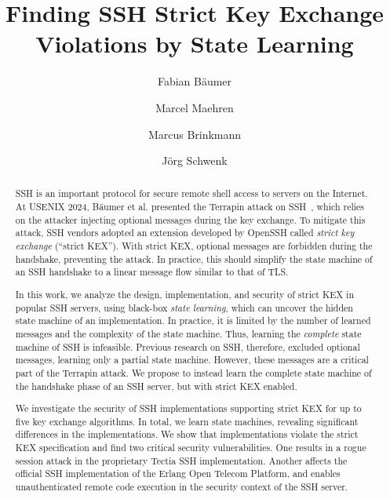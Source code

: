 \documentclass[sigconf]{acmart}
\begin{document}
\title{Finding SSH Strict Key Exchange Violations by State Learning}

\author{Fabian Bäumer}

\author{Marcel Maehren}

\author{Marcus Brinkmann}

\author{Jörg Schwenk}

\renewcommand{\shortauthors}{Fabian Bäumer, Marcel Maehren, Marcus Brinkmann, and Jörg Schwenk}

\begin{abstract}
  SSH is an important protocol for secure remote shell access to servers on the Internet. At USENIX 2024, Bäumer et al. presented the Terrapin attack on SSH~\cite{USENIX:BauBriSch24}, which relies on the attacker injecting optional messages during the key exchange. To mitigate this attack, SSH vendors adopted an extension developed by OpenSSH called \emph{strict key exchange} (``strict KEX''). With strict KEX, optional messages are forbidden during the handshake, preventing the attack. In practice, this should simplify the state machine of an SSH handshake to a linear message flow similar to that of TLS.
  
  In this work, we analyze the design, implementation, and security of strict KEX in popular SSH servers, using black-box \emph{state learning}, which can uncover the hidden state machine of an implementation. In practice, it is limited by the number of learned messages and the complexity of the state machine. Thus, learning the \emph{complete} state machine of SSH is infeasible. Previous research on SSH, therefore, excluded optional messages, learning only a partial state machine. However, these messages are a critical part of the Terrapin attack. We propose to instead learn the complete state machine of the handshake phase of an SSH server, but with strict KEX enabled.

  We investigate the security of \nrImplementations SSH implementations supporting strict KEX for up to five key exchange algorithms. In total, we learn \nrStateMachines state machines, revealing significant differences in the implementations. We show that \nrViolatingImplementations implementations violate the strict KEX specification and find two critical security vulnerabilities. One results in a rogue session attack in the proprietary Tectia SSH implementation. Another affects the official SSH implementation of the Erlang Open Telecom Platform, and enables unauthenticated remote code execution in the security context of the SSH server.
\end{abstract}
\end{document}
